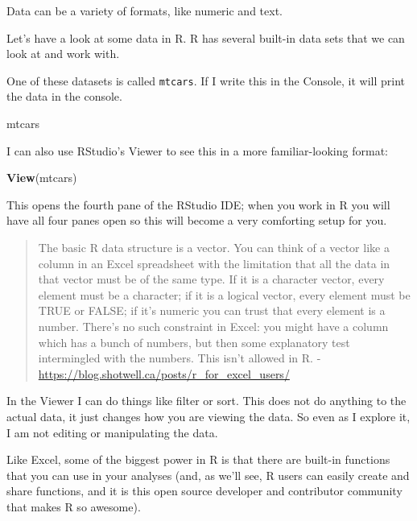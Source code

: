 \documentclass[]{book}
\newenvironment{Shaded}{\begin{snugshade}}{\end{snugshade}}
\newcommand{\KeywordTok}[1]{\textcolor[rgb]{0.13,0.29,0.53}{\textbf{#1}}}
\newcommand{\NormalTok}[1]{#1}
\begin{document}
Data can be a variety of formats, like numeric and text.

Let's have a look at some data in R. R has several built-in data sets that we can look at and work with.

One of these datasets is called \texttt{mtcars}. If I write this in the Console, it will print the data in the console.

\begin{Shaded}
\begin{Highlighting}[]
\NormalTok{mtcars}
\end{Highlighting}
\end{Shaded}

I can also use RStudio's Viewer to see this in a more familiar-looking format:

\begin{Shaded}
\begin{Highlighting}[]
\KeywordTok{View}\NormalTok{(mtcars)}
\end{Highlighting}
\end{Shaded}

This opens the fourth pane of the RStudio IDE; when you work in R you will have all four panes open so this will become a very comforting setup for you.

\begin{quote}
The basic R data structure is a vector. You can think of a vector like a column in an Excel spreadsheet with the limitation that all the data in that vector must be of the same type. If it is a character vector, every element must be a character; if it is a logical vector, every element must be TRUE or FALSE; if it's numeric you can trust that every element is a number. There's no such constraint in Excel: you might have a column which has a bunch of numbers, but then some explanatory test intermingled with the numbers. This isn't allowed in R. - \url{https://blog.shotwell.ca/posts/r_for_excel_users/}
\end{quote}

In the Viewer I can do things like filter or sort. This does not do anything to the actual data, it just changes how you are viewing the data. So even as I explore it, I am not editing or manipulating the data.

Like Excel, some of the biggest power in R is that there are built-in functions that you can use in your analyses (and, as we'll see, R users can easily create and share functions, and it is this open source developer and contributor community that makes R so awesome).
\end{document}
